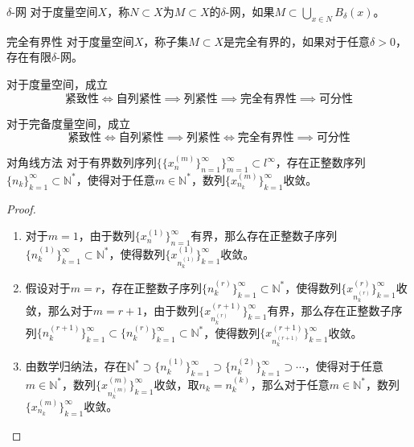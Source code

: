 \documentclass[lang = cn, scheme = chinese, thmcnt = section]{elegantbook}
\newcommand{\N}{\mathbb{N}}            %
\newcommand{\sub}{\subset}             %
\begin{document}
\begin{definition}{$\delta$-网}
	对于度量空间$X$，称$N\sub X$为$M\sub X$的$\delta$-网，如果$\displaystyle M\sub \bigcup_{x\in N}B_\delta(x)$。
\end{definition}

\begin{definition}{完全有界性}
	对于度量空间$X$，称子集$M\sub X$是完全有界的，如果对于任意$\delta>0$，存在有限$\delta$-网。
\end{definition}

\begin{theorem}
	对于度量空间，成立
	$$
	\text{紧致性} \iff \text{自列紧性} \implies \text{列紧性}\implies \text{完全有界性} \implies \text{可分性}
	$$
\end{theorem}

\begin{theorem}
	对于完备度量空间，成立
	$$
	\text{紧致性} \iff \text{自列紧性} \implies \text{列紧性}\iff \text{完全有界性} \implies \text{可分性}
	$$
\end{theorem}

\begin{theorem}{对角线方法}
	对于有界数列序列$\{ \{x_n^{(m)}\}_{n=1}^{\infty} \}_{m=1}^{\infty}\sub l^\infty$，存在正整数序列$\{n_k\}_{k=1}^{\infty}\sub\N^*$，使得对于任意$m\in\N^*$，数列$\{ x_{n_k}^{(m)} \}_{k=1}^{\infty}$收敛。
\end{theorem}

\begin{proof}
	\begin{enumerate}
		\item 对于$m=1$，由于数列$\{ x_n^{(1)} \}_{n=1}^{\infty}$有界，那么存在正整数子序列$\{ n_k^{(1)} \}_{k=1}^{\infty}\sub\N^*$，使得数列$\{ x_{n_k^{(1)}}^{(1)} \}_{k=1}^{\infty}$收敛。
		\item 假设对于$m=r$，存在正整数子序列$\{ n_k^{(r)} \}_{k=1}^{\infty}\sub \N^*$，使得数列$\{ x_{n_k^{(r)}}^{(r)} \}_{k=1}^{\infty}$收敛，那么对于$m=r+1$，由于数列$\{ x_{n_k^{(r)}}^{(r+1)} \}_{k=1}^{\infty}$有界，那么存在正整数子序列$\{ n_k^{(r+1)} \}_{k=1}^{\infty}\sub \{ n_k^{(r)} \}_{k=1}^{\infty}\sub \N^*$，使得数列$\{ x_{n_k^{(r+1)}}^{(r+1)} \}_{k=1}^{\infty}$收敛。
		\item 由数学归纳法，存在$\N^*\supset \{ n_k^{(1)} \}_{k=1}^{\infty} \supset \{ n_k^{(2)} \}_{k=1}^{\infty}\supset\cdots$，使得对于任意$m\in\N^*$，数列$\{ x_{n_k^{(m)}}^{(m)} \}_{k=1}^{\infty}$收敛，取$n_k=n_k^{(k)}$，那么对于任意$m\in\N^*$，数列$\{ x_{n_k}^{(m)} \}_{k=1}^{\infty}$收敛。
	\end{enumerate}
\end{proof}
\end{document}
